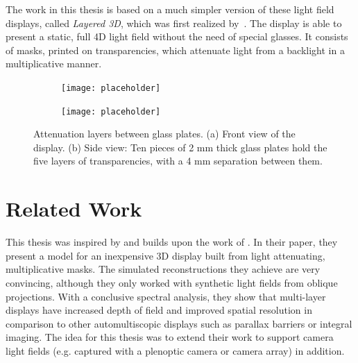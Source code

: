 The work in this thesis is based on a much simpler version of these light field displays, called \emph{Layered 3D}, which was first realized by~\cite{WetzsteinTomo}.
The display is able to present a static, full 4D light field without the need of special glasses.
It consists of masks, printed on transparencies, which attenuate light from a backlight in a multiplicative manner.

\begin{figure}
	\centering
	\begin{subfigure}[t]{.4\textwidth}
		\texttt{[image: placeholder]}
		\caption{}
		\label{fig:attenuation_layers_and_glasses}
	\end{subfigure}
	\begin{subfigure}[t]{.4\textwidth}
		\texttt{[image: placeholder]}
		\caption{}
		\label{fig:close_up_of_layers_between_glasses}
	\end{subfigure}
	\caption[Attenuation layers between glass plates]
			{Attenuation layers between glass plates.
			 (a) Front view of the display.
			 (b) Side view: Ten pieces of 2 mm thick glass plates hold the five layers of transparencies, with a 4 mm separation between them.}
\end{figure}

\section{Related Work}

This thesis was inspired by and builds upon the work of \cite{WetzsteinTomo}.
In their paper, they present a model for an inexpensive 3D display built from light attenuating, multiplicative masks.
The simulated reconstructions they achieve are very convincing, although they only worked with synthetic light fields from oblique projections.
With a conclusive spectral analysis, they show that multi-layer displays have increased depth of field and improved spatial resolution in comparison to other automultiscopic displays such as parallax barriers or integral imaging.
The idea for this thesis was to extend their work to support camera light fields (e.g. captured with a plenoptic camera or camera array) in addition.